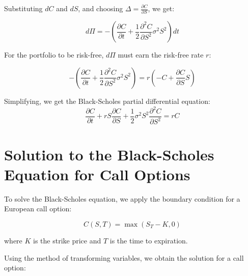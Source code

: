 \documentclass[../main.tex]{subfiles}
\begin{document}
{Substituting \( dC \) and \( dS \), and choosing \( \Delta = \frac{\partial C}{\partial S} \), we get:

\begin{equation}
    d\Pi = -\left( \frac{\partial C}{\partial t} + \frac{1}{2} \frac{\partial^2 C}{\partial S^2} \sigma^2 S^2 \right) dt
\end{equation}

For the portfolio to be risk-free, \( d\Pi \) must earn the risk-free rate \( r \):

\begin{equation}
    -\left( \frac{\partial C}{\partial t} + \frac{1}{2} \frac{\partial^2 C}{\partial S^2} \sigma^2 S^2 \right) = r \left( -C + \frac{\partial C}{\partial S} S \right)
\end{equation}

Simplifying, we get the Black-Scholes partial differential equation:
\begin{equation*}
    \frac{\partial C}{\partial t} + r S \frac{\partial C}{\partial S} + \frac{1}{2} \sigma^2 S^2 \frac{\partial^2 C}{\partial S^2} = r C
\end{equation*}

}



\section{Solution to the Black-Scholes Equation for Call Options}

To solve the Black-Scholes equation, we apply the boundary condition for a European call option:

\begin{equation}
    C(S, T) = \max(S_T - K, 0)
\end{equation}

where \( K \) is the strike price and \( T \) is the time to expiration.

Using the method of transforming variables, we obtain the solution for a call option:

\end{document}
